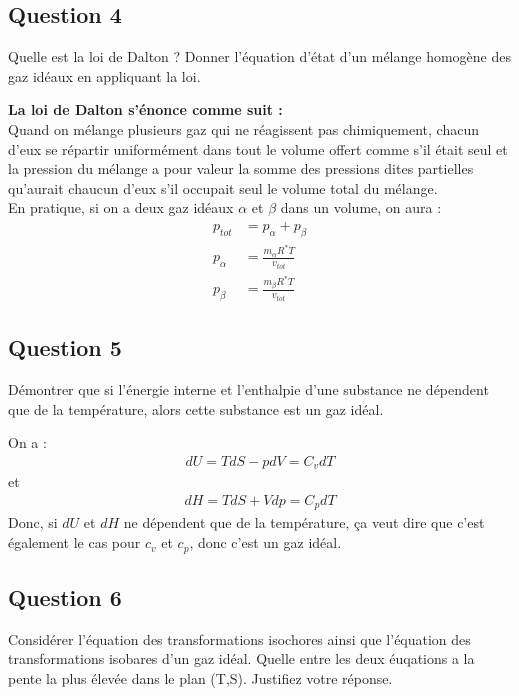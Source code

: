 \subsection*{Question 4}

Quelle est la loi de Dalton ? Donner l'équation d'état d'un mélange homogène des gaz idéaux en appliquant la loi.

\begin{tcolorbox}
    \textbf{La loi de Dalton s'énonce comme suit : }\\
    Quand on mélange plusieurs gaz qui ne réagissent pas chimiquement, chacun d'eux se répartir uniformément dans tout le volume offert comme s'il était seul et la pression du mélange
    a pour valeur la somme des pressions dites partielles qu'aurait chaucun d'eux s'il occupait seul le volume total du mélange.\\

    En pratique, si on a deux gaz idéaux $\alpha$ et $\beta$ dans un volume, on aura :
    \begin{align*}
        p_{tot} &= p_\alpha + p_\beta\\
        p_\alpha &= \frac{m_\alpha R^* T}{v_{tot}}\\
        p_\beta &= \frac{m_\beta R^* T}{v_{tot}}
    \end{align*}

\end{tcolorbox}

\subsection*{Question 5}
Démontrer que si l'énergie interne et l'enthalpie d'une substance ne dépendent que de la température, alors cette substance est un gaz idéal.

\begin{tcolorbox}
    On a : 
    \begin{align*}
        dU = TdS - pdV = C_v dT
    \end{align*}
    et 
    \begin{align*}
        dH = TdS + Vdp = C_p dT
    \end{align*}
    Donc, si $dU$ et $dH$ ne dépendent que de la température, ça veut dire que c'est également le cas
    pour $c_v$ et $c_p$, donc c'est un gaz idéal.
\end{tcolorbox}


\subsection*{Question 6}
Considérer l'équation des transformations isochores ainsi que l'équation des transformations isobares d'un gaz idéal. Quelle entre les
deux éuqations a la pente la plus élevée dans le plan (T,S). Justifiez votre réponse.

